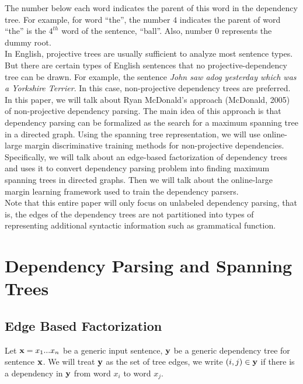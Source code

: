 \documentclass[12pt]{article}
\begin{document}
The number below each word indicates the parent of this word in the dependency tree. For example, for word ``the'',  the number $4$ indicates the parent of word ``the'' is the $4^{th}$ word of the sentence, ``ball''. Also, number $0$ represents the dummy root. \\

In English, projective trees are usually sufficient to analyze most sentence types. But there are certain types of English sentences that no projective-dependency tree can be drawn. For example, the sentence \emph {John saw adog yesterday which was a Yorkshire Terrier}. In this case, non-projective dependency trees are preferred. \\

In this paper, we will talk about Ryan McDonald's approach (McDonald, 2005) of non-projective dependency parsing. The main idea of this approach is that dependency parsing can be formalized as the search for a maximum spanning tree in a directed graph. Using the spanning tree representation, we will use online-large margin discriminative training methods for non-projective dependencies. \\

Specifically, we will talk about an edge-based factorization of dependency trees and uses it to convert dependency parsing problem into finding maximum spanning trees in directed graphs. Then we will talk about the online-large margin learning framework used to train the dependency parsers. \\

Note that this entire paper will only focus on unlabeled dependency parsing, that is, the edges of the dependency trees are not partitioned into types of representing additional syntactic information such as grammatical function.

\section{Dependency Parsing and Spanning Trees}

\subsection{Edge Based Factorization}

Let ${\bf x} = x_1...x_n$ be a generic input sentence, ${\bf y}$ be a generic dependency tree for sentence ${\bf x}$. We will treat ${\bf y}$ as the set of tree edges, we write $(i,j) \in {\bf y}$ if there is a dependency in ${\bf y}$ from word $x_i$ to word $x_j$. \\
\end{document}
